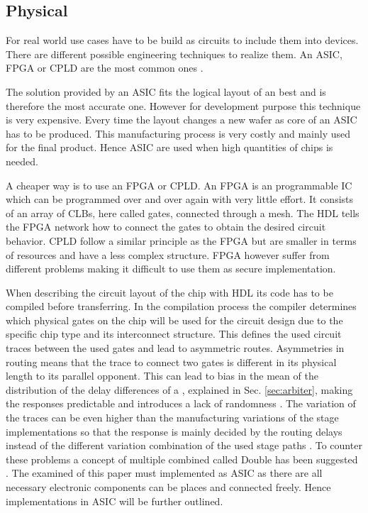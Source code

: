 \subsection{Physical}
\label{sec:physical}

For real world use cases \apufs have to be build as circuits to include them into devices.
There are different possible engineering techniques to realize them.
An \ac{ASIC}, \ac{FPGA} or \ac{CPLD} are the most common ones \cite{Maes2012ExperimentalCMOS, Majzoobi2010FPGALines, Soybali2011ImplementationFPGA, Tajik2014PhysicalPUFs}.

The solution provided by an \ac{ASIC} fits the logical layout of an \apuf best and is therefore the most accurate one.
However for development purpose this technique is very expensive.
Every time the layout changes a new wafer as core of an \ac{ASIC} has to be produced.
This manufacturing process is very costly and mainly used for the final product.
Hence \ac{ASIC} are used when high quantities of chips is needed.

A cheaper way is to use an \ac{FPGA} or \ac{CPLD}. 
An \ac{FPGA} is an programmable \ac{IC} which can be programmed over and over again with very little effort.
It consists of an array of \acp{CLB}, here called gates, connected through a mesh.
The \ac{HDL} tells the \ac{FPGA} network how to connect the gates to obtain the desired circuit behavior.
\ac{CPLD} follow a similar principle as the \ac{FPGA} but are smaller in terms of resources and have a less complex structure.
\ac{FPGA} however suffer from different problems making it difficult to use them as secure \apuf implementation.

When describing the circuit layout of the chip with \ac{HDL} its code has to be compiled before transferring.
In the compilation process the compiler determines which physical gates on the chip will be used for the circuit design due to the specific chip type and its interconnect structure.
This defines the used circuit traces between the used gates and lead to asymmetric routes. %
Asymmetries in routing means that the trace to connect two gates is different in its physical length to its parallel opponent.
This can lead to bias in the mean of the distribution of the delay differences of a \apuf, explained in Sec. \ref{sec:arbiter}, making the responses predictable and introduces a lack of randomness \cite{Majzoobi2010FPGALines, Morozov2010AnFPGA}.
The variation of the traces can be even higher than the manufacturing variations of the stage implementations so that the response is mainly decided by the routing delays instead of the different variation combination of the used stage paths \cite{Majzoobi2009TechniquesPUFs}.
To counter these problems a concept of multiple combined \apuf called Double \apuf has been suggested \cite{Machida2015ImplementationFPGA, Machida2015AFPGA}.
The examined \apufs of this paper must implemented as \ac{ASIC} as there are all necessary electronic components can be places and connected freely.
Hence \apuf implementations in \ac{ASIC} will be further outlined.


